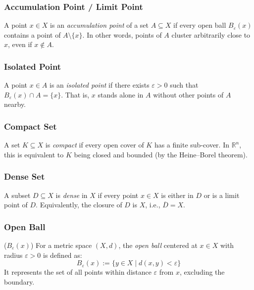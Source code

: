 	 \subsubsection{Accumulation Point / Limit Point}
		 A point \( x \in X \) is an \emph{accumulation point} of a set \( A \subseteq X \)
		  if every open ball \( B_\varepsilon(x) \) contains a point of \( A \setminus \{x\} \). 
	      In other words, points of \( A \) cluster arbitrarily close to 
		  \( x \), even if \( x \notin A \).

	 \subsubsection{Isolated Point} 
	      A point \( x \in A \) is an \emph{isolated point} if there exists \( \varepsilon > 0 \)
		   such that \( B_\varepsilon(x) \cap A = \{x\} \). 
	      That is, \( x \) stands alone in \( A \) without other points of \( A \) nearby.

	 \subsubsection{Compact Set} 
	      A set \( K \subseteq X \) is \emph{compact} if every open cover of \( K \) has a finite sub-cover. 
	      In \(\mathbb{R}^n\), this is equivalent to \( K \) being closed and bounded (by the Heine–Borel theorem).

	 \subsubsection{Dense Set} 
	      A subset \( D \subseteq X \) is \emph{dense} in \( X \) if every point 
		  \( x \in X \) is either in \( D \) or is a limit point of \( D \). 
	      Equivalently, the closure of \( D \) is \( X \), i.e., \( \overline{D} = X \).

	 \subsubsection{Open Ball} (\( B_\varepsilon(x) \)) 
	      For a metric space \( (X, d) \), the \emph{open ball} centered at 
		  \( x \in X \) with radius \( \varepsilon > 0 \) is defined as: 
	      \[
		      B_\varepsilon(x) := \{ y \in X \mid d(x, y) < \varepsilon \}
	      \]
	      It represents the set of all points within distance \( \varepsilon \) from \( x \), excluding the boundary.
